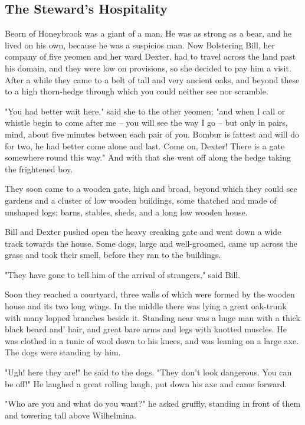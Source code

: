 \documentclass[twoside,11pt,b5paper,twocolumn]{scrbook}
\begin{document}
\subsection{The Steward's Hospitality}
Beorn of Honeybrook was a giant of a man. He was as strong as a bear, and he lived on his own, because he was a suspicios man.
Now Bolstering Bill, her company of five yeomen and her ward Dexter, had to travel across the land past his domain, and they were low on provisions, so she decided to pay him a visit. After a while they came to a belt of tall and very ancient oaks, and beyond these to a high thorn-hedge through which you could neither see nor scramble.

"You had better wait here," said she to the other yeomen; "and when I call or whistle begin to come after me – you will see the way I go – but only in pairs, mind, about five minutes between each pair of you. Bombur is fattest and will do for two, he had better come alone and last. Come on, Dexter! There is a gate somewhere round this way." And with that she went off along the hedge taking the frightened boy.

They soon came to a wooden gate, high and broad, beyond which they could see gardens and a cluster of low wooden buildings, some thatched and made of unshaped logs; barns, stables, sheds, and a long low wooden house.

Bill and Dexter pushed open the heavy creaking gate and went down a wide track towards the house. Some dogs, large and well-groomed, came up across the grass and took their smell, before they ran to the buildings.

"They have gone to tell him of the arrival of strangers," said Bill.

Soon they reached a courtyard, three walls of which were formed by the wooden house and its two long wings. In the middle there was lying a great oak-trunk with many lopped branches beside it. Standing near was a huge man with a thick black beard and' hair, and great bare arms and legs with knotted muscles. He was clothed in a tunic of wool down to his knees, and was leaning on a large axe. The dogs were standing by him.

"Ugh! here they are!" he said to the dogs. "They don't look dangerous. You can be off!" He laughed a great rolling laugh, put down his axe and came forward.

"Who are you and what do you want?" he asked gruffly, standing in front of them and towering tall above Wilhelmina.
\end{document}
